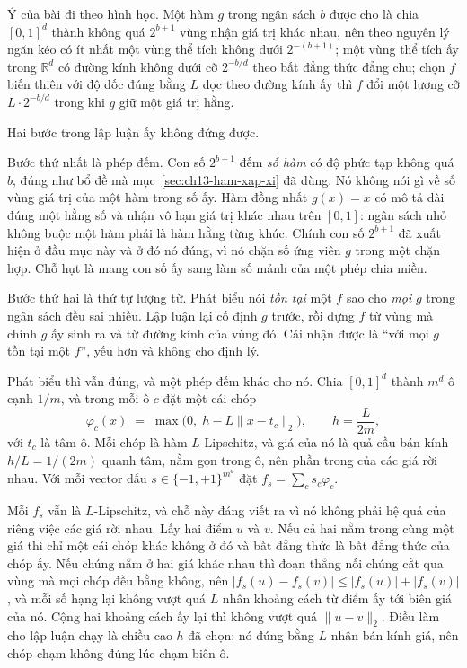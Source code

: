 Ý của bài đi theo hình học. Một hàm $g$ trong ngân sách $b$ được cho là chia
$[0,1]^d$ thành không quá $2^{b+1}$ vùng nhận giá trị khác nhau, nên theo nguyên
lý ngăn kéo có ít nhất một vùng thể tích không dưới $2^{-(b+1)}$; một vùng thể
tích ấy trong $\mathbb{R}^d$ có đường kính không dưới cỡ $2^{-b/d}$ theo bất
đẳng thức đẳng chu; chọn $f$ biến thiên với độ dốc đúng bằng $L$ dọc theo đường
kính ấy thì $f$ đổi một lượng cỡ $L \cdot 2^{-b/d}$ trong khi $g$ giữ một giá
trị hằng.

Hai bước trong lập luận ấy không đứng được.

Bước thứ nhất là phép đếm. Con số $2^{b+1}$ đếm \emph{số hàm} có độ phức tạp
không quá $b$, đúng như bổ đề mà mục~\ref{sec:ch13-ham-xap-xi} đã dùng. Nó không
nói gì về số vùng giá trị của một hàm trong số ấy. Hàm đồng nhất $g(x) = x$ có
mô tả dài đúng một hằng số và nhận vô hạn giá trị khác nhau trên $[0,1]$: ngân
sách nhỏ không buộc một hàm phải là hàm hằng từng khúc. Chính con số $2^{b+1}$
đã xuất hiện ở đầu mục này và ở đó nó đúng, vì nó chặn số ứng viên $g$ trong một
chặn hợp. Chỗ hụt là mang con số ấy sang làm số mảnh của một phép chia miền.

Bước thứ hai là thứ tự lượng từ. Phát biểu nói \emph{tồn tại} một $f$ sao cho
\emph{mọi} $g$ trong ngân sách đều sai nhiều. Lập luận lại cố định $g$ trước, rồi
dựng $f$ từ vùng mà chính $g$ ấy sinh ra và từ đường kính của vùng đó. Cái nhận
được là \enquote{với mọi $g$ tồn tại một $f$}, yếu hơn và không cho định lý.

Phát biểu thì vẫn đúng, và một phép đếm khác cho nó. Chia $[0,1]^d$ thành $m^d$
ô cạnh $1/m$, và trong mỗi ô $c$ đặt một cái chóp
\[
  \varphi_c(x) \;=\; \max\!\big(0,\; h - L\lVert x - t_c \rVert_2\big),
  \qquad h = \frac{L}{2m},
\]
với $t_c$ là tâm ô. Mỗi chóp là hàm $L$-Lipschitz, và giá của nó là quả cầu bán
kính $h/L = 1/(2m)$ quanh tâm, nằm gọn trong ô, nên phần trong của các giá rời
nhau. Với mỗi
vector dấu $s \in \{-1,+1\}^{m^d}$ đặt $f_s = \sum_c s_c \varphi_c$.

Mỗi $f_s$ vẫn là $L$-Lipschitz, và chỗ này đáng viết ra vì nó không phải hệ quả
của riêng việc các giá rời nhau. Lấy hai điểm $u$ và $v$. Nếu cả hai nằm trong
cùng một giá thì chỉ một cái chóp khác không ở đó và bất đẳng thức là bất đẳng
thức của chóp ấy. Nếu chúng nằm ở hai giá khác nhau thì đoạn thẳng nối chúng cắt
qua vùng mà mọi chóp đều bằng không, nên
$|f_s(u) - f_s(v)| \le |f_s(u)| + |f_s(v)|$, và mỗi số hạng lại không vượt quá
$L$ nhân khoảng cách từ điểm ấy tới biên giá của nó. Cộng hai khoảng cách ấy lại
thì không vượt quá $\lVert u - v \rVert_2$. Điều làm cho lập luận chạy là chiều
cao $h$ đã chọn: nó đúng bằng $L$ nhân bán kính giá, nên chóp chạm không đúng
lúc chạm biên ô.

